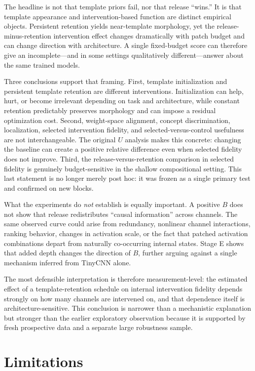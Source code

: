 \documentclass[10pt]{article}
\begin{document}
The headline is not that template priors fail, nor that release ``wins.'' It is that template appearance and intervention-based function are distinct empirical objects. Persistent retention yields near-template morphology, yet the release-minus-retention intervention effect changes dramatically with patch budget and can change direction with architecture. A single fixed-budget score can therefore give an incomplete---and in some settings qualitatively different---answer about the same trained models.

Three conclusions support that framing. First, template initialization and persistent template retention are different interventions. Initialization can help, hurt, or become irrelevant depending on task and architecture, while constant retention predictably preserves morphology and can impose a residual optimization cost. Second, weight-space alignment, concept discrimination, localization, selected intervention fidelity, and selected-versus-control usefulness are not interchangeable. The original $U$ analysis makes this concrete: changing the baseline can create a positive relative difference even when selected fidelity does not improve. Third, the release-versus-retention comparison in selected fidelity is genuinely budget-sensitive in the shallow compositional setting. This last statement is no longer merely post hoc: it was frozen as a single primary test and confirmed on new blocks.

What the experiments do \emph{not} establish is equally important. A positive $B$ does not show that release redistributes ``causal information'' across channels. The same observed curve could arise from redundancy, nonlinear channel interactions, ranking behavior, changes in activation scale, or the fact that patched activation combinations depart from naturally co-occurring internal states. Stage E shows that added depth changes the direction of $B$, further arguing against a single mechanism inferred from TinyCNN alone.

The most defensible interpretation is therefore measurement-level: the estimated effect of a template-retention schedule on internal intervention fidelity depends strongly on how many channels are intervened on, and that dependence itself is architecture-sensitive. This conclusion is narrower than a mechanistic explanation but stronger than the earlier exploratory observation because it is supported by fresh prospective data and a separate large robustness sample.

\section{Limitations}\label{sec:limitations}
\end{document}
